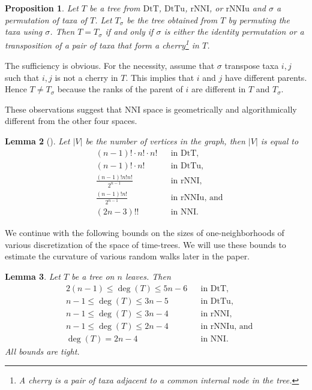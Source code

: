 \documentclass{amsart}
\newtheorem{lemma}{Lemma}
\newtheorem{proposition}[lemma]{Proposition}
\theoremstyle{definition}
\newcommand{\nni}{\mathrm{NNI}}
\newcommand{\rnni}{\mathrm{rNNI}}
\newcommand{\rnniu}{\mathrm{rNNIu}}
\newcommand{\dtt}{\mathrm{DtT}}
\newcommand{\dttu}{\mathrm{DtTu}}
\begin{document}
\begin{proposition}
Let $T$ be a tree from $\dtt$, $\dttu$, $\rnni$, or $\rnniu$ and $\sigma$ a permutation of taxa of $T$.
Let $T_\sigma$ be the tree obtained from $T$ by permuting the taxa using $\sigma$.
Then $T = T_\sigma$ if and only if $\sigma$ is either the identity permutation or a transposition of a pair of taxa that form a
cherry\footnote{A {\em cherry} is a pair of taxa adjacent to a common internal node in the tree.}
in $T$.
\end{proposition}

\proof
The sufficiency is obvious.
For the necessity, assume that $\sigma$ transpose taxa $i,j$ such that $i,j$ is not a cherry in $T$.
This implies that $i$ and $j$ have different parents.
Hence $T \ne T_\sigma$ because the ranks of the parent of $i$ are different in $T$ and $T_\sigma$.
\endproof

These observations suggest that $\nni$ space is geometrically and algorithmically different from the other four spaces.

\begin{lemma}[\textcite{Semple2003-nj}]\label{spaceSizes}
Let $|V|$ be the number of vertices in the graph, then $|V|$ is equal to
\begin{align*}
& (n-1)! \cdot n! \cdot n!	&& \mbox{in $\dtt$,}\\
& (n-1)! \cdot n!		&& \mbox{in $\dttu$,}\\
& \frac{(n-1)!n!n!}{2^{n-1}}	&& \mbox{in $\rnni$,}\\
& \frac{(n-1)!n!}{2^{n-1}}	&& \mbox{in $\rnniu$, and}\\
& (2n - 3)!!			&& \mbox{in $\nni$.}
\end{align*}
\end{lemma}

We continue with the following bounds on the sizes of one-neighborhoods of various discretization of the space of time-trees.
We will use these bounds to estimate the curvature of various random walks later in the paper.

\begin{lemma}\label{neighBound}
Let $T$ be a tree on $n$ leaves.
Then
\begin{align*}
& 2(n-1) \leq \deg(T) \leq 5n-6	&& \mbox{in $\dtt$,}\\
& n-1 \leq \deg(T) \leq 3n-5	&& \mbox{in $\dttu$,}\\
& n-1\leq \deg(T) \leq3n-4 	&& \mbox{in $\rnni$,}\\
& n-1 \leq \deg(T) \leq 2n-4 	&& \mbox{in $\rnniu$, and}\\
& \deg(T) = 2n-4 		&& \mbox{in $\nni$.}
\end{align*}
All bounds are tight.
\end{lemma}
\end{document}
